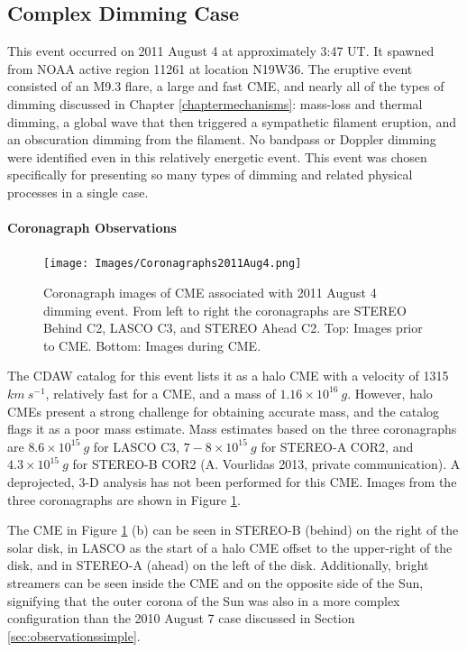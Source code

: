 \subsection{Complex Dimming Case}
This event occurred on 2011 August 4 at approximately 3:47 UT. It spawned from NOAA active region 11261 at location N19W36. The eruptive event consisted of an M9.3 flare, a large and fast CME, and nearly all of the types of dimming discussed in Chapter \ref{chaptermechanisms}: mass-loss and thermal dimming, a global wave that then triggered a sympathetic filament eruption, and an obscuration dimming from the filament. No bandpass or Doppler dimming were identified even in this relatively energetic event. This event was chosen specifically for presenting so many types of dimming and related physical processes in a single case. 

\paragraph{Coronagraph Observations}

\begin{figure}[!h]
    \begin{center}
	    \texttt{[image: Images/Coronagraphs2011Aug4.png]}
    \end{center}
    \caption[LASCO and STEREO coronagraph data for 2011 August 4 event]{ 
        Coronagraph images of CME associated with 2011 August 4 dimming event. 
        From left to right the coronagraphs are STEREO Behind C2, LASCO C3, and STEREO Ahead C2. Top: Images prior to CME. 
        Bottom: Images during CME. 
    }
    \label{coronagraphs2011aug4}
\end{figure}

The CDAW catalog for this event lists it as a halo CME with a velocity of 1315 $km\ s^{-1}$, relatively fast for a CME, and a mass of $1.16 \times 10^{16}\ g$. However, halo CMEs present a strong challenge for obtaining accurate mass, and the catalog flags it as a poor mass estimate. Mass estimates based on the three coronagraphs are $8.6 \times 10^{15}\ g$ for LASCO C3, $7-8 \times 10^{15}\ g$ for STEREO-A COR2, and $4.3 \times 10^{15}\ g$ for STEREO-B COR2 (A. Vourlidas 2013, private communication). A deprojected, 3-D analysis has not been performed for this CME. Images from the three coronagraphs are shown in Figure \ref{coronagraphs2011aug4}. 

The CME in Figure \ref{coronagraphs2011aug4} (b) can be seen in STEREO-B (behind) on the right of the solar disk, in LASCO as the start of a halo CME offset to the upper-right of the disk, and in STEREO-A (ahead) on the left of the disk. Additionally, bright streamers can be seen inside the CME and on the opposite side of the Sun, signifying that the outer corona of the Sun was also in a more complex configuration than the 2010 August 7 case discussed in Section \ref{sec:observationssimple}. 

